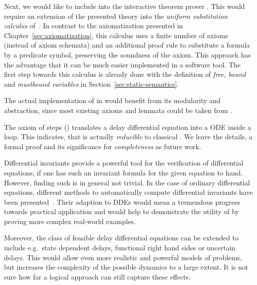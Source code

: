         Next, we would like to include \ddL into the interactive theorem prover \KeYmaeraX.
        This would require an extension of the presented theory into the \emph{uniform substitution calculus} of~\cite{Platzer15Uniform}.
        In contrast to the axiomatization presented in Chapter~\ref{sec:axiomatization}, this calculus uses a finite number of axioms (instead of axiom schemata) and an additional proof rule to substitute a formula by a predicate symbol, preserving the soundness of the axiom. This approach has the advantage that it can be much easier implemented in a software tool.
        The first step towards this calculus is already done with the definition of \emph{free, bound} and \emph{mustbound variables} in Section~\ref{sec:static-semantics}.

        The actual implementation of \ddL in \KeYmaeraX would benefit from its modularity and abstraction, since most existing axioms and lemmata could be taken from \dL.

        The axiom of steps () translates a delay differential equation into a ODE inside a loop. This indicates, that \ddL is actually \emph{reducible} to classical \dL. We leave the details, a formal proof and its significance for \emph{completeness} as future work.

        Differential invariants provide a powerful tool for the verification of differential equations, if one has such an invariant formula for the given equation to hand.
        However, finding such is in general not trivial. In the case of ordinary differential equations, different methods to automatically compute differential invariants have been presented~\cite{Platzer12LogicsDynSys}.
        Their adaption to DDEs would mean a tremendous progress towards practical application and would help to demonstrate the utility of \ddL by proving more complex real-world examples.
                
        Moreover, the class of feasible delay differential equations can be extended to include e.g.\ state dependent delays, functional right hand sides or uncertain delays.
        This would allow even more realistic and powerful models of problems, but increases the complexity of the possible dynamics to a large extent.
        It is not sure how far a logical approach can still capture these effects.

        

